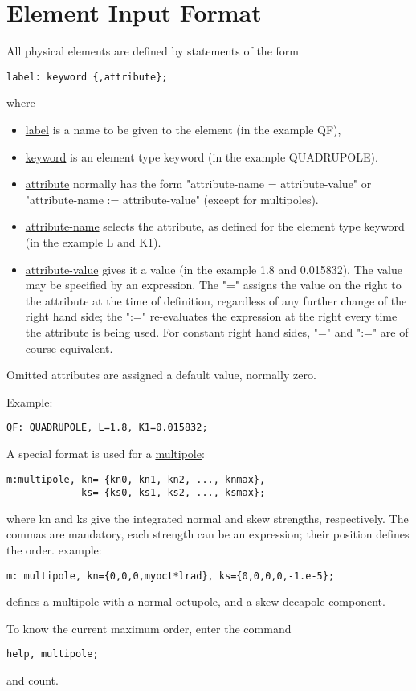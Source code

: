 
\section{Element Input Format}
All physical elements are defined by statements of the form 
\begin{verbatim}
label: keyword {,attribute};
\end{verbatim} 
where 
\begin{itemize}
	\item \href{label.html}{label} is a name to be given to the element (in the example QF), 
	\item \href{keyword.html}{keyword} is an element type keyword (in the example QUADRUPOLE). 
	\item \href{attribute.html}{attribute} normally has the form
          "attribute-name = attribute-value" or
          "attribute-name := attribute-value" (except for multipoles).  
	\item \href{label.html}{attribute-name} selects the attribute,
          as defined for the element type keyword (in the example L and
          K1).  
	\item \href{attribute.html}{attribute-value} gives it a value
          (in the example 1.8 and 0.015832). The value may be specified
          by an expression. The "=" assigns the value on the right to
          the attribute at the time of definition, regardless of any
          further change of the right hand side; the ":=" re-evaluates
          the expression at the right every time the attribute is being
          used. For constant right hand sides, "=" and ":=" are of
          course equivalent.  
\end{itemize} 

Omitted attributes are assigned a default value, normally zero. 

Example: 
\begin{verbatim}
QF: QUADRUPOLE, L=1.8, K1=0.015832;
\end{verbatim} 

A special format is used for a \href{multipole.html}{multipole}: 
\begin{verbatim}
m:multipole, kn= {kn0, kn1, kn2, ..., knmax},
             ks= {ks0, ks1, ks2, ..., ksmax};
\end{verbatim} 
where kn and ks give the integrated normal and skew strengths,
respectively. The commas are mandatory, each strength can be an
expression; their position defines the order. example:  
\begin{verbatim}
m: multipole, kn={0,0,0,myoct*lrad}, ks={0,0,0,0,-1.e-5};
\end{verbatim} 
defines a multipole with a normal octupole, and a skew decapole component. 

To know the current maximum order, enter the command 
\begin{verbatim}
help, multipole;
\end{verbatim} 
and count. 


